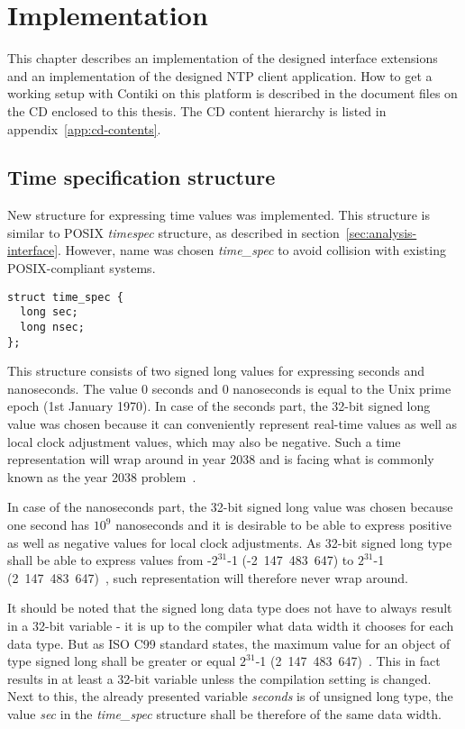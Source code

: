 
\chapter{Implementation}
This chapter describes an implementation of the designed interface extensions
and an implementation of the designed NTP client application.
How to get a working setup with Contiki on this platform is described in
the document files on the CD enclosed to this thesis.
The CD content hierarchy is listed in appendix~\ref{app:cd-contents}.


\section{Time specification structure}
New structure for expressing time values was implemented.
This structure is similar to POSIX {\it{timespec}} structure,
as described in section~\ref{sec:analysis-interface}.
However, name was chosen {\it{time\_spec}} to avoid collision with
existing POSIX-compliant systems.
\begin{lstlisting}
struct time_spec {
  long sec;
  long nsec;
};
\end{lstlisting}
This structure consists of two signed long values for expressing seconds and nanoseconds.
The value 0 seconds and 0 nanoseconds is equal to the Unix prime epoch (1st January 1970).
In case of the seconds part, the 32-bit signed long value was chosen because
it can conveniently
represent real-time values as well as local clock adjustment values, which may also be negative.
Such a time representation will wrap around in year 2038 and is facing
what is commonly known as the year 2038 problem~\cite{posix}.

In case of the nanoseconds part, the 32-bit signed long value was chosen because
one second has $10^9$ nanoseconds and it is
desirable to be able to express positive as well as negative values for local clock adjustments.
As 32-bit signed long type shall be able to express values from -$2^{31}$-1 (-2~147~483~647)
to $2^{31}$-1 (2~147~483~647)~\cite{c99},
such representation will therefore never wrap around.

It should be noted that the signed long data type does not have to always result in a 32-bit variable -
it is up to the compiler what data width it chooses for each data type.
But as ISO C99 standard states, the maximum value for an object of type signed long
shall be greater or equal $2^{31}$-1 (2~147~483~647)~\cite{c99}.
This in fact results in at least a 32-bit variable unless the compilation setting is changed.
Next to this, the already presented variable {\it{seconds}} is of unsigned long type,
the value {\it{sec}} in the {\it{time\_spec}} structure %
shall be therefore of the same data width.

